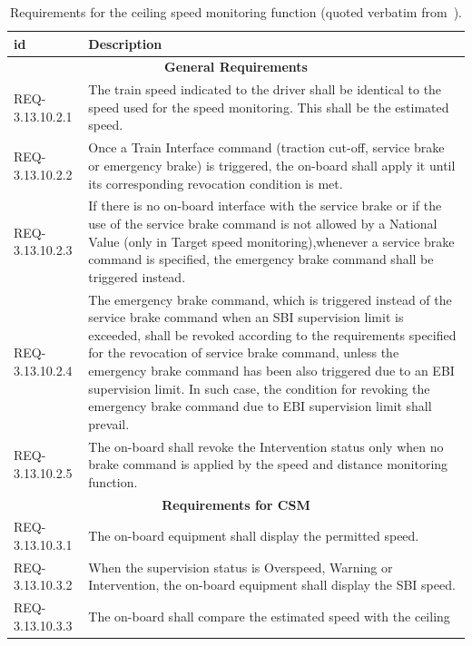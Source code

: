 {\tabsize
\renewcommand{\arraystretch}{1.2}

\begin{longtable}{lp{}}
\caption{Requirements for the ceiling speed monitoring function
  (quoted verbatim
  from~\cite[3.13.10]{ETCSSRS-Principles}).\label{tab:req}}\\
\hline\hline
{\bf id} & {\bf Description}
\\\hline
\multicolumn{2}{c}{{\bf General Requirements}}\\\hline
REQ-3.13.10.2.1 & The train speed indicated to the driver shall be identical to the speed used for the speed monitoring. This shall be the estimated speed.
\\\hline
REQ-3.13.10.2.2 & Once a Train Interface command (traction cut-off, service brake or emergency brake) is triggered, the on-board shall apply it until its corresponding revocation condition is met.
\\\hline
REQ-3.13.10.2.3 &
If there is no on-board interface with the service brake or if the use of the service brake command is not allowed by a National Value (only in Target speed monitoring),whenever a service brake command is specified, the emergency brake command shall be triggered instead.
\\\hline
REQ-3.13.10.2.4 &
The emergency brake command, which is triggered instead of the service brake command when an SBI supervision limit is exceeded, shall be revoked according to the requirements specified for the revocation of service brake command, unless the emergency brake command has been also triggered due to an EBI supervision limit. In such case, the condition for revoking the emergency brake command due to EBI supervision limit shall prevail.
\\\hline
REQ-3.13.10.2.5 &
The on-board shall revoke the Intervention status only when no brake command is applied by the speed and distance monitoring function.
\\\hline
\multicolumn{2}{c}{{\bf Requirements for CSM}}\\\hline
REQ-3.13.10.3.1&
The on-board equipment shall display the permitted speed.
\\\hline
REQ-3.13.10.3.2 &
When the supervision status is Overspeed, Warning or Intervention, the on-board equipment shall display the SBI speed.
\\\hline
REQ-3.13.10.3.3&
The on-board shall compare the estimated speed with the ceiling

\end{longtable}}
